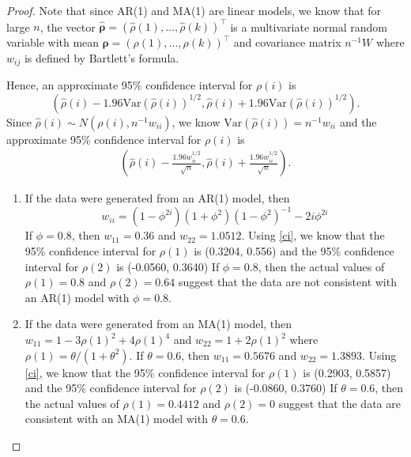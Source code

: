 \documentclass[12pt]{article}
\theoremstyle{definition}
\newcommand{\V}{\text{Var}}
\newcommand{\vect}[1]{\boldsymbol{#1}}
\begin{document}
\begin{proof}
  Note that since AR(1) and MA(1) are linear models, we know that for large $n$,
  the vector $\vect{\hat{\rho}} = (\hat{\rho}(1), \dots, \hat{\rho}(k))^\intercal$
  is a multivariate normal random variable with mean $\vect{\rho} = (\rho(1), \dots, \rho(k))^\intercal$
  and covariance matrix $n^{-1}W$ where $w_{ij}$ is defined by Bartlett's formula.

  Hence, an approximate 95\% confidence interval for
  $\rho(i)$ is
  \[
    \left(\hat{\rho}(i) - 1.96\V(\hat{\rho}(i))^{1/2}, \hat{\rho}(i) + 1.96\V(\hat{\rho}(i))^{1/2}\right).
  \]
  Since $\hat{\rho}(i) \sim N(\rho(i), n^{-1}w_{ii})$, we know $\V(\hat{\rho}(i)) = n^{-1}w_{ii}$ and the
  approximate 95\% confidence interval for $\rho(i)$ is
  \begin{align}\label{ci}
    \left(\hat{\rho}(i) - \frac{1.96w_{ii}^{1/2}}{\sqrt{n}}, \hat{\rho}(i) + \frac{1.96w_{ii}^{1/2}}{\sqrt{n}}\right).
  \end{align}
  \begin{enumerate}
    \item If the data were generated from an AR(1) model,
      then $$w_{ii} = (1 - \phi^{2i})(1 + \phi^2)(1 - \phi^2)^{-1} - 2i\phi^{2i}$$
      If $\phi = 0.8$, then $w_{11} = 0.36$ and $w_{22} = 1.0512$. Using \eqref{ci}, we know
      that the 95\% confidence interval for $\rho(1)$ is (0.3204, 0.556) and
      the 95\% confidence interval for $\rho(2)$ is (-0.0560, 0.3640)
      If $\phi = 0.8$, then the actual values of $\rho(1) = 0.8$ and $\rho(2) = 0.64$
      suggest that the data are not consistent with an AR(1) model with
      $\phi = 0.8.$
    \item If the data were generated from an MA(1) model,
      then $w_{11} = 1 - 3 \rho(1)^2 + 4 \rho(1)^4$ and $w_{22} = 1 + 2 \rho(1)^2$ where $\rho(1) = \theta / (1 + \theta^2)$.
      If $\theta = 0.6$, then $w_{11} = 0.5676$ and $w_{22} = 1.3893$. Using \eqref{ci}, we know
      that the 95\% confidence interval for $\rho(1)$ is (0.2903, 0.5857) and
      the 95\% confidence interval for $\rho(2)$ is (-0.0860, 0.3760)
      If $\theta = 0.6$, then the actual values of $\rho(1) = 0.4412$ and $\rho(2) = 0$
      suggest that the data are consistent with an MA(1) model with
      $\theta = 0.6.$
  \end{enumerate}
\end{proof}
\end{document}
